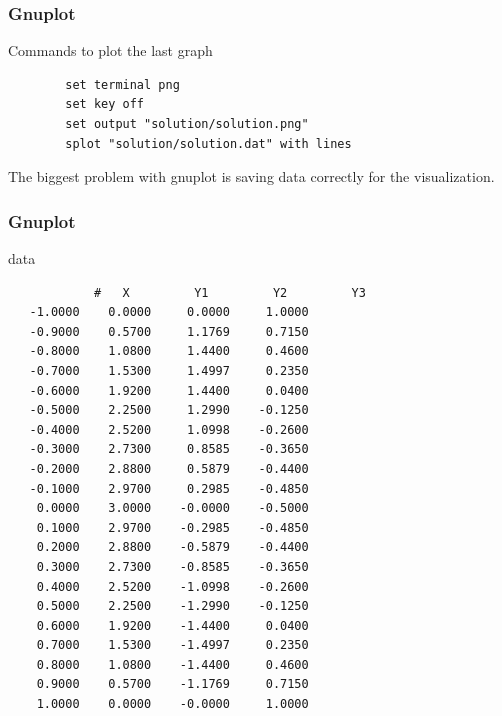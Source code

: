 \documentclass{beamer}
\begin{document}
\begin{frame}[fragile]

    \frametitle{Gnuplot}

    \begin{block}{Commands to plot the last graph}
        \begin{verbatim}
        set terminal png
        set key off
        set output "solution/solution.png"
        splot "solution/solution.dat" with lines
        \end{verbatim}
    \end{block}

    \vspace{1cm}

    \begin{block}{ }
        The biggest problem with gnuplot is saving data correctly for the
        visualization.
    \end{block}

\end{frame}


\begin{frame}[fragile]

    \frametitle{Gnuplot}

    
    \begin{block}{data}
        \begin{verbatim}
            #   X         Y1         Y2         Y3
   -1.0000    0.0000     0.0000     1.0000
   -0.9000    0.5700     1.1769     0.7150
   -0.8000    1.0800     1.4400     0.4600
   -0.7000    1.5300     1.4997     0.2350
   -0.6000    1.9200     1.4400     0.0400
   -0.5000    2.2500     1.2990    -0.1250
   -0.4000    2.5200     1.0998    -0.2600
   -0.3000    2.7300     0.8585    -0.3650
   -0.2000    2.8800     0.5879    -0.4400
   -0.1000    2.9700     0.2985    -0.4850
    0.0000    3.0000    -0.0000    -0.5000
    0.1000    2.9700    -0.2985    -0.4850
    0.2000    2.8800    -0.5879    -0.4400
    0.3000    2.7300    -0.8585    -0.3650
    0.4000    2.5200    -1.0998    -0.2600
    0.5000    2.2500    -1.2990    -0.1250
    0.6000    1.9200    -1.4400     0.0400
    0.7000    1.5300    -1.4997     0.2350
    0.8000    1.0800    -1.4400     0.4600
    0.9000    0.5700    -1.1769     0.7150
    1.0000    0.0000    -0.0000     1.0000

        \end{verbatim}
    \end{block}

\end{frame}
\end{document}

